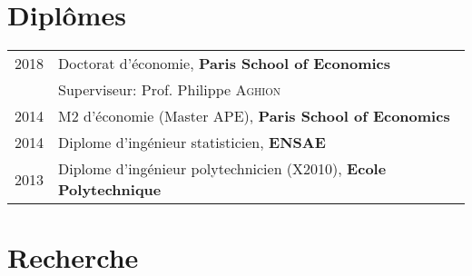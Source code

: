 \documentclass[12pt]{article}
\begin{document}
\section*{Diplômes}
\begin{tabular}{p{2cm}l}	
 \textsc{2018} & Doctorat d'économie, \textbf{Paris School of Economics}\\
& \footnotesize{Superviseur: Prof. Philippe \textsc{Aghion}} \\
\textsc{2014} & M2 d'économie (Master APE), \textbf{Paris School of Economics}\\
\textsc{2014} & Diplome d'ingénieur statisticien, \textbf{ENSAE}\\
\textsc{2013} & Diplome d'ingénieur polytechnicien (X2010), \textbf{Ecole Polytechnique}\\
\end{tabular}

\section*{Recherche}
\end{document}
